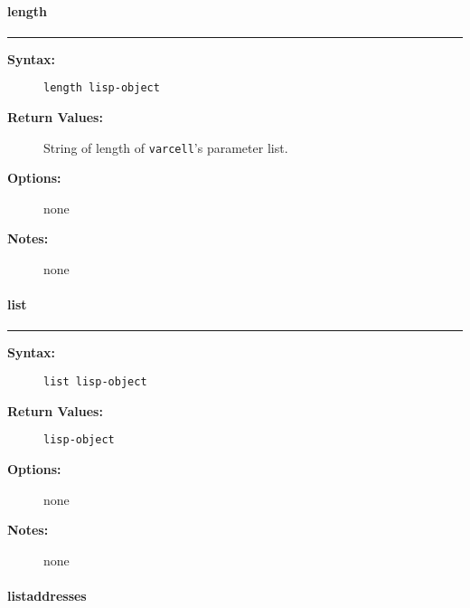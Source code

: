 \vspace {2pt}


\paragraph{length}

\hrule
\begin{description}
\item[{\bf Syntax:}] \mbox{}

{\tt length lisp-object}

\item[{\bf Return Values:}] \mbox{}

String of length of {\tt varcell}'s 
parameter list.

\item[{\bf Options:}] \mbox{}

none  

\item[{\bf Notes:}] \mbox{}

none  

\end{description}


\vspace {2pt}


\paragraph{list}

\hrule
\begin{description}
\item[{\bf Syntax:}] \mbox{}

{\tt list lisp-object}

\item[{\bf Return Values:}] \mbox{}

{\tt lisp-object}

\item[{\bf Options:}] \mbox{}

none  

\item[{\bf Notes:}] \mbox{}

none

\end{description}


\vspace {2pt}


\paragraph{listaddresses}


